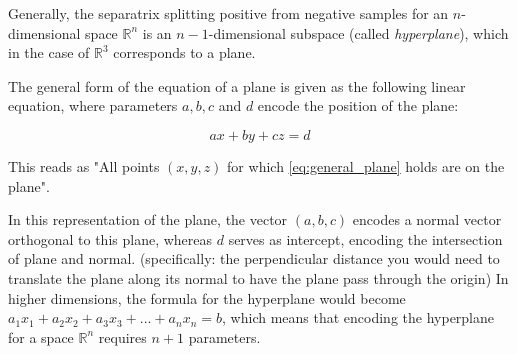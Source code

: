 Generally, the separatrix splitting positive from negative samples for an $n$-dimensional space $\mathds{R}^n$ is an $n-1$-dimensional subspace (called \textit{hyperplane}), which in the case of $\mathds{R}^3$ corresponds to a plane. 

The general form of the equation of a plane is given as the following linear equation, where parameters $a, b, c$ and $d$ encode the position of the plane:

\begin{equation}
	\label{eq:general_plane}
	ax + by + cz = d
\end{equation}

This reads as "All points $(x,y,z)$ for which \ref{eq:general_plane} holds are on the plane". 

In this representation of the plane, the vector $(a,b,c)$ encodes a normal vector orthogonal to this plane, whereas $d$ serves as intercept, encoding the intersection of plane and normal. (specifically: the perpendicular distance you would need to translate the plane along its normal to have the plane pass through the origin) In higher dimensions, the formula for the hyperplane would become $a_1x_1+a_2x_2+a_3x_3+...+a_nx_n = b$, which means that encoding the hyperplane for a space $\mathds{R}^n$ requires $n+1$ parameters.






